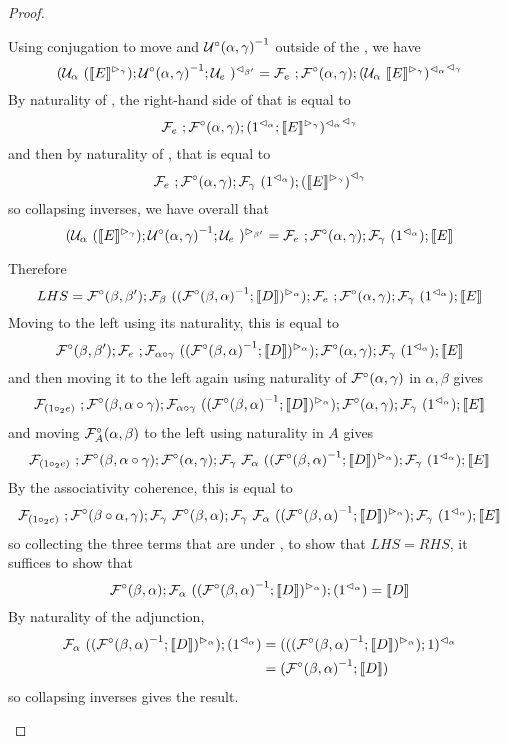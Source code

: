 \documentclass{drl-common/llncs}
\renewcommand{\sem}[1]{\ensuremath{ \llbracket #1 \rrbracket}}
\newcommand{\inv}[1]{\ensuremath{{#1}^{-1}}}
\newcommand\compo[2]{\ensuremath{#1 \circ #2}}
\newcommand\comph[2]{\ensuremath{#1 \mathbin{\circ_2} #2}}
\begin{document}
\begin{proof}
\begin{itemize}
Using conjugation to move  and
\inv{\semUcomp(\alpha,\gamma)} outside of the , we have
\[
\semrtol{(\semU{\alpha}{(\semltor{\sem{E}}{\gamma})};\inv{\semUcomp(\alpha,\gamma)};\semU{e})}{\beta'}
= 
\semF{e};\semFcomp(\alpha,\gamma);\semrtol{{\semrtol{(\semU{\alpha}{\semltor{\sem E}{\gamma}})}{\alpha}}}{\gamma}
\]
By naturality of \semrtol{-}{\alpha}, the right-hand side of that is equal to
\[
\semF{e};\semFcomp(\alpha,\gamma);\semrtol{{\semrtol{(\semrtol{1}{\alpha};\semltor{\sem{E}}{\gamma})}{\alpha}}}{\gamma}
\]
and then by naturality of \semrtol{-}{\gamma}, that is equal to
\[
\semF{e};\semFcomp(\alpha,\gamma);\semF{\gamma}{(\semrtol{1}{\alpha})};\semrtol{{{(\semltor{\sem{E}}{\gamma})}}}{\gamma}
\]
so collapsing inverses, we have overall that
\[
\semltor{(\semU{\alpha}{(\semltor{\sem{E}}{\gamma})};\inv{\semUcomp(\alpha,\gamma)};\semU{e})}{\beta'}
=
\semF{e};\semFcomp(\alpha,\gamma);\semF{\gamma}{(\semrtol{1}{\alpha})};\sem{E}
\]

Therefore 
\[
LHS = \semFcomp(\beta,\beta');\semF{\beta}{(\semltor{(\inv{\semFcomp(\beta,\alpha)};\sem{D})}{\alpha}  )};
\semF{e};\semFcomp(\alpha,\gamma);\semF{\gamma}{(\semrtol{1}{\alpha})};\sem{E}
\]
Moving  to the left using its naturality, this is equal to
\[
\semFcomp(\beta,\beta');\semF{e};\semF{\compo{\alpha}{\gamma}}{(\semltor{(\inv{\semFcomp(\beta,\alpha)};\sem{D})}{\alpha}  )} ;\semFcomp(\alpha,\gamma);\semF{\gamma}{(\semrtol{1}{\alpha})};\sem{E}
\]
and then moving it to the left again using naturality of
$\mathcal{F}^\circ(\alpha,\gamma)$ in $\alpha,\beta$ gives
\[
\semF{(\comph{1}{e})};\semFcomp(\beta,\compo{\alpha}{\gamma});\semF{\compo{\alpha}{\gamma}}{(\semltor{(\inv{\semFcomp(\beta,\alpha)};\sem{D})}{\alpha}  )};\semFcomp(\alpha,\gamma);\semF{\gamma}{(\semrtol{1}{\alpha})};\sem{E}
\]
and moving $\mathcal{F}^\circ_A(\alpha,\beta)$ to the left using naturality in $A$ gives
\[
\semF{(\comph{1}{e})};\semFcomp(\beta,\compo{\alpha}{\gamma});\semFcomp(\alpha,\gamma);\semF{\gamma}{\semF{\alpha}{(\semltor{(\inv{\semFcomp(\beta,\alpha)};\sem{D})}{\alpha}  )}};\semF{\gamma}{(\semrtol{1}{\alpha})};\sem{E}
\]
By the associativity coherence, this is equal to
\[
\semF{(\comph{1}{e})};\semFcomp(\compo{\beta}{\alpha},{\gamma});\semF{\gamma}{\semFcomp(\beta,\alpha)};\semF{\gamma}{\semF{\alpha}{(\semltor{(\inv{\semFcomp(\beta,\alpha)};\sem{D})}{\alpha}  )}};\semF{\gamma}{(\semrtol{1}{\alpha})};\sem{E}
\]
so collecting the three terms that are under \semF{\gamma}, to show that $LHS
= RHS$, it suffices to show that
\[
{\semFcomp(\beta,\alpha)};{\semF{\alpha}{(\semltor{(\inv{\semFcomp(\beta,\alpha)};\sem{D})}{\alpha})}};{(\semrtol{1}{\alpha})} = \sem D
\]
By naturality of the adjunction,
\begin{align*}
\semF{\alpha}{(\semltor{(\inv{\semFcomp(\beta,\alpha)};\sem{D})}{\alpha})};(\semrtol{1}{\alpha})
&= 
\semrtol{({(\semltor{(\inv{\semFcomp(\beta,\alpha)};\sem{D})}{\alpha})};1)}{\alpha}\\
&=
{(\inv{\semFcomp(\beta,\alpha)};\sem{D})}
\end{align*}
so collapsing inverses gives the result.  


\end{itemize}
\end{proof}
\end{document}
